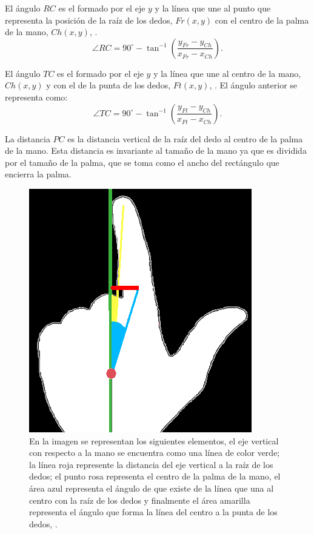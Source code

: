 El ángulo $RC$ es el formado por el eje $y$  y la línea que une al punto que representa la posición de la raíz de los dedos, $Fr(x,y)$ con el centro de la palma de la mano, $Ch(x,y)$, \citep{Sgouropoulos2014}. 
\begin{equation}
\angle RC = 90^\circ - \tan^{-1} \left( \frac{ y_{Fr}-y_{Ch} }{ x_{Fr}-x_{Ch} } \right).
\end{equation}


El ángulo $TC$ es el formado por el eje $y$ y la línea que une al centro de la mano, $Ch(x,y)$ y con el de la punta de los dedos, $Ft(x,y)$, \citep{Sgouropoulos2014}. El  ángulo anterior se representa como:
\begin{equation}
\angle TC = 90^\circ - \tan^{-1} \left( \frac{ y_{Ft}-y_{Ch} }{ x_{Ft}-x_{Ch} } \right).
\end{equation}
 

La distancia $PC$ es la distancia vertical de la raíz del dedo al centro de la palma de la mano. Esta distancia es invariante al tamaño de la mano ya que es dividida por el tamaño de la palma, que se toma como el ancho del rectángulo que encierra la palma.  

\begin{figure}[h!]
\begin{center}
\includegraphics[scale=.6]{./Figures/angles.png}
\end{center}
\caption{En la imagen se representan los siguientes elementos, el eje vertical con respecto a la mano se encuentra como una línea de color verde; la línea roja represente la distancia del eje vertical a la raíz de los dedos; el punto rosa representa el centro de la palma de la mano, el área azul representa el ángulo de que existe de la línea que una al centro con la raíz de los dedos y finalmente el área amarilla representa el ángulo que forma la línea del centro a la punta de los dedos, \protect\citep{Sgouropoulos2014}.}
\label{fig:anglesFingers}
\end{figure} 


